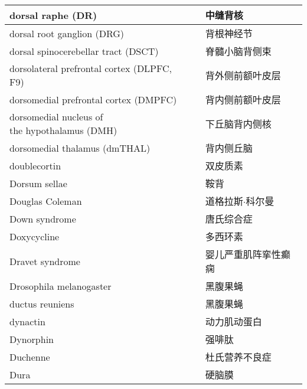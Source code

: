 \begin{longtable}{lll}
	\midrule
	dorsal raphe (DR)     &&  中缝背核  \\
	
	\midrule
	dorsal root ganglion (DRG)     &&  背根神经节  \\
	
	\midrule
	dorsal spinocerebellar tract (DSCT)     &&  脊髓小脑背侧束  \\
	
	\midrule
	dorsolateral prefrontal cortex (DLPFC, F9)     &&  背外侧前额叶皮层  \\
	
	\midrule
	dorsomedial prefrontal cortex (DMPFC)     &&  背内侧前额叶皮层  \\
	
	\midrule
	\makecell[l]{dorsomedial nucleus of \\the hypothalamus (DMH)}    &&  下丘脑背内侧核  \\
	
	\midrule
	dorsomedial thalamus (dmTHAL)     &&  背内侧丘脑  \\
	
	\midrule
	doublecortin     &&  双皮质素  \\
	
	\midrule
	Dorsum sellae     &&  鞍背  \\
	
	\midrule
	Douglas Coleman     &&  道格拉斯$\cdot$科尔曼  \\
	
	\midrule
	Down syndrome     &&  唐氏综合症  \\
	
	\midrule
	Doxycycline     &&  多西环素  \\
	
	\midrule
	Dravet syndrome     &&  婴儿严重肌阵挛性癫痫  \\
	
	\midrule
	Drosophila melanogaster     &&  黑腹果蝇  \\
	
	\midrule
	ductus reuniens     &&  黑腹果蝇  \\
	
	\midrule
	dynactin     &&  动力肌动蛋白  \\
	
	\midrule
	Dynorphin     &&  强啡肽  \\
	
	\midrule
	Duchenne     &&  杜氏营养不良症  \\
	
	\midrule
	Dura     &&  硬脑膜  \\
	

\end{longtable}
